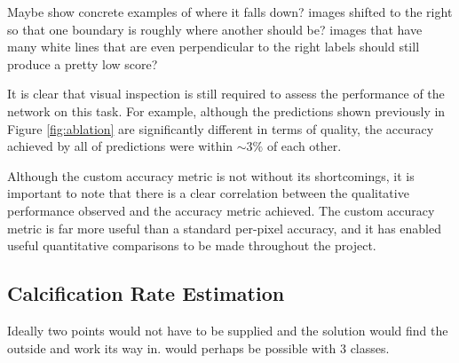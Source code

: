 Maybe show concrete examples of where it falls down? images shifted to the right so that one boundary is roughly where another should be? images that have many white lines that are even perpendicular to the right labels should still produce a pretty low score?

It is clear that visual inspection is still required to assess the performance of the network on this task. For example, although the predictions shown previously in Figure \ref{fig:ablation} are significantly different in terms of quality, the accuracy achieved by all of predictions were within ${\sim}3\%$ of each other.

Although the custom accuracy metric is not without its shortcomings, it is important to note that there is a clear correlation between the qualitative performance observed and the accuracy metric achieved. The custom accuracy metric is far more useful than a standard per-pixel accuracy, and it has enabled useful quantitative comparisons to be made throughout the project.

\subsection{Calcification Rate Estimation}

Ideally two points would not have to be supplied and the solution would find the outside and work its way in. would perhaps be possible with 3 classes.




